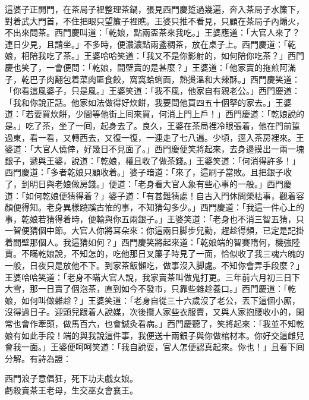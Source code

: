 這婆子正開門，在茶局子裡整理茶鍋，張見西門慶踅過幾遍，奔入茶局子水簾下，對着武大門首，不住把眼只望簾子裡瞧。王婆只推不看見，{}只顧在茶局子內煽火，不出來問茶。西門慶叫道：「乾娘，點兩盃茶來我吃。」王婆應道：「大官人來了？連日少見，{}且請坐。」不多時，便濃濃點兩盞稠茶，放在桌子上。西門慶道：「乾娘，相陪我吃了茶。」王婆哈哈笑道：「我又不是你影射的，如何陪你吃茶？」西門慶也笑了，一會便問：「乾娘，間壁賣的是甚麼？」王婆道：「他家賣的拖煎阿滿子，乾巴子肉翻包着菜肉匾食餃，窩窩蛤蜊面，熱燙溫和大辣酥。」{}西門慶笑道：「你看這風婆子，只是風。」王婆笑道：「我不風，他家自有親老公。」{}西門慶道：「我和你說正話。他家如法做得好炊餅，我要問他買四五十個拏的家去。」王婆道：「若要買炊餅，少間等他街上囘來買，何消上門上戶！」西門慶道：「乾娘說的是。」吃了茶，坐了一囘，起身去了。良久，王婆在茶局裡冷眼張着，他在門前踅過東，看一看，又轉西去，又復一復，一連走了七八遍。少頃，逕入茶房裡來。王婆道：「大官人僥倖，好幾日不見面了。」{}西門慶便笑將起來，去身邊摸出一兩一塊銀子，遞與王婆，說道：「乾娘，權且收了做茶錢。」王婆笑道：「何消得許多！」西門慶道：「多者乾娘只顧收着。」婆子暗道：「來了，這刷子當敗。且把銀子收了，到明日與老娘做房錢。」便道：「老身看大官人象有些心事的一般。」{}西門慶道：「如何乾娘便猜得着？」婆子道：「有甚難猜處！自古入門休問榮枯事，觀着容顏便得知。老身異樣蹺蹊古恠的事，不知猜勾多少。」西門慶道：「我這一件心上的事，乾娘若猜得着時，便輸與你五兩銀子。」王婆笑道：「老身也不消三智五猜，只一智便猜個中節。大官人你將耳朵來：你這兩日脚步兒勤，趕趁得頻，已定是記掛着間壁那個人。我這猜如何？」西門慶笑將起來道：「乾娘端的智賽隋何，機強陸賈。不瞞乾娘說，不知怎的，吃他那日叉簾子時見了一面，恰似收了我三魂六魄的一般，日夜只是放他不下。到家茶飯懶吃，做事沒入脚處。不知你會弄手段麼？」王婆哈哈笑道：「老身不瞞大官人說，我家賣茶叫做鬼打更。三年前六月初三日下大雪，那一日賣了個泡茶，直到如今不發市，只靠些雜趁養口。」西門慶道：「乾娘，如何叫做雜趁？」王婆笑道：「老身自從三十六歲沒了老公，丟下這個小厮，沒得過日子。迎頭兒跟着人說媒，次後攬人家些衣服賣，又與人家抱腰收小的，閑常也會作牽頭，做馬百六，也會鍼灸看病。」{}西門慶聽了，笑將起來：「我並不知乾娘有如此手段！端的與我說這件事，我便送十兩銀子與你做棺材本。你好交這雌兒會我一面。」王婆便呵呵笑道：「我自說耍，官人怎便認真起來。你也！」且看下囘分解。有詩為證：

\begin{myquote}
西門浪子意倡狂，死下功夫戲女娘。\\虧殺賣茶王老母，生交巫女會襄王。
\end{myquote}

